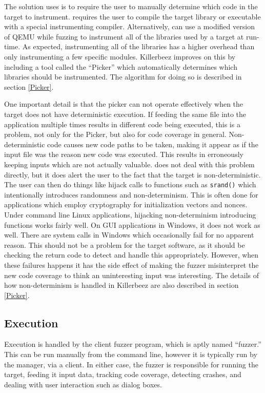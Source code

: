 The solution \AFL{} uses is to require the user to manually determine which code
in the target to instrument. \AFL{} requires the user to compile the target library
or executable with a special instrumenting compiler. Alternatively, \AFL{} can
use a modified version of QEMU while fuzzing to instrument all of the libraries
used by a target at run-time.  As expected, instrumenting all of the libraries
has a higher overhead than only instrumenting a few specific modules. Killerbeez
improves on this by including a tool
called the ``Picker'' which automatically determines which libraries should be
instrumented.  The algorithm for doing so is described in section \ref{Picker}.

One important detail is that the picker can not operate effectively when the
target does not have deterministic execution.  If feeding the same file into
the application multiple times results in different code being executed, this
is a problem, not only for the Picker, but also for code coverage in general.
Non-deterministic code causes new code paths to be taken, making it appear as
if the input file was the reason new code was executed.  This results in
erroneously keeping inputs which are not actually valuable.
\AFL{} does not deal with this problem directly, but it does alert the user to
the fact that the target is non-deterministic. The user can then do things like
hijack calls to functions such as \texttt{srand()} which intentionally introduces
randomness and non-determinism. This is often done for applications which employ cryptography for
initialization vectors and nonces. Under command line Linux applications, hijacking non-determinism introducing functions
works fairly well.  On GUI applications in Windows, it does not work as well.
There are system calls in Windows which occasionally fail for no apparent reason. This
should not be a problem for the target software, as it should be checking the return code to
detect and handle this appropriately.  However, when these failures happens it has the
side effect of making the fuzzer misinterpret the new code coverage to think an uninteresting input was interesting.
The details of how non-determinism is handled in Killerbeez are also described in
section \ref{Picker}.

\subsection{Execution}
Execution is handled by the client fuzzer program, which is aptly named ``fuzzer.''
This can be run manually from the command line, however it is typically run by
the manager, via a \BOINC{} client.  In either case, the fuzzer is responsible
for running the target, feeding it input data, tracking code
coverage, detecting crashes, and dealing with user interaction such as dialog
boxes.


